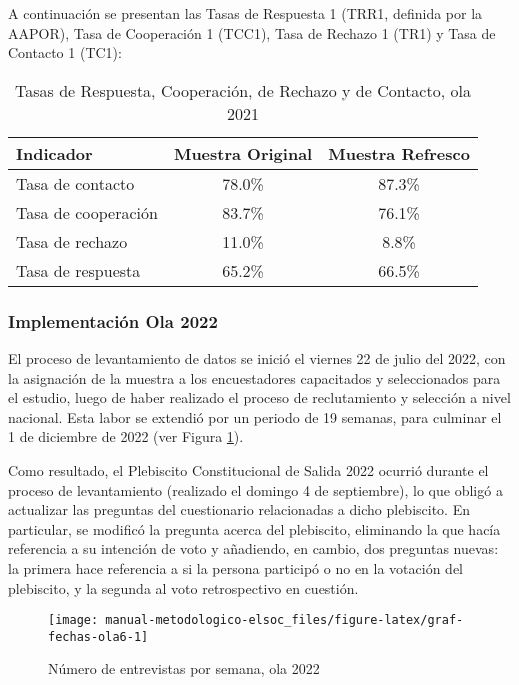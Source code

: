 \documentclass[
  12pt,
]{article}
\begin{document}
A continuación se presentan las Tasas de Respuesta 1 (TRR1, definida por la AAPOR), Tasa de Cooperación 1 (TCC1), Tasa de Rechazo 1 (TR1) y Tasa de Contacto 1 (TC1):

\begin{table}[H]

\caption{\label{tab:tabla-tasas-ola5}Tasas de Respuesta, Cooperación, de Rechazo y de Contacto, ola 2021}
\centering
\begin{tabular}[t]{lcc}
\toprule
Indicador & Muestra Original & Muestra Refresco\\
\midrule
Tasa de contacto & 78.0\% & 87.3\%\\
Tasa de cooperación & 83.7\% & 76.1\%\\
Tasa de rechazo & 11.0\% & 8.8\%\\
Tasa de respuesta & 65.2\% & 66.5\%\\
\bottomrule
\end{tabular}
\end{table}

\hypertarget{implementaciuxf3n-ola-2022}{%
\subsubsection{Implementación Ola 2022}\label{implementaciuxf3n-ola-2022}}

El proceso de levantamiento de datos se inició el viernes 22 de julio del 2022, con la asignación de la muestra a los encuestadores capacitados y seleccionados para el estudio, luego de haber realizado el proceso de reclutamiento y selección a nivel nacional. Esta labor se extendió por un periodo de 19 semanas, para culminar el 1 de diciembre de 2022 (ver Figura \ref{fig:graf-fechas-ola6}).

Como resultado, el Plebiscito Constitucional de Salida 2022 ocurrió durante el proceso de levantamiento (realizado el domingo 4 de septiembre), lo que obligó a actualizar las preguntas del cuestionario relacionadas a dicho plebiscito. En particular, se modificó la pregunta acerca del plebiscito, eliminando la que hacía referencia a su intención de voto y añadiendo, en cambio, dos preguntas nuevas: la primera hace referencia a si la persona participó o no en la votación del plebiscito, y la segunda al voto retrospectivo en cuestión.

\begin{figure}

{\centering \texttt{[image: manual-metodologico-elsoc\_files/figure-latex/graf-fechas-ola6-1]} 

}

\caption{Número de entrevistas por semana, ola 2022}\label{fig:graf-fechas-ola6}
\end{figure}
\end{document}
